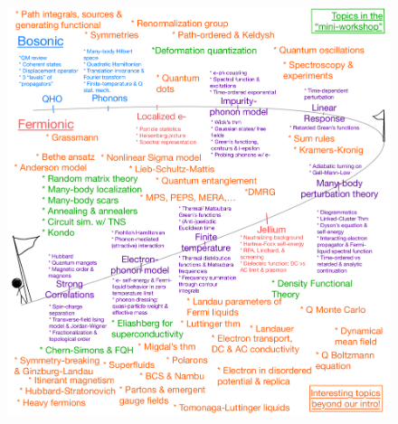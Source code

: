 \begin{figure}[H]
    \centering
    \includegraphics[width=\textwidth]{jupyterbook/data/fig/lec26-fig23.png}
\end{figure}
